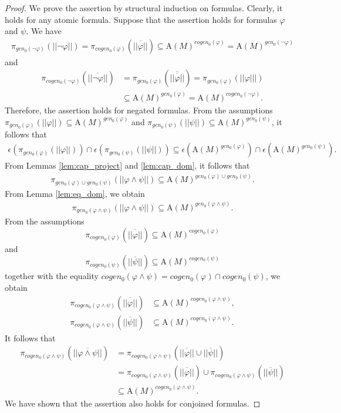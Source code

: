 \documentclass[10pt,a4paper]{amsart}
\def\A{\textrm{A}}
\def\cogen{cogen}
\def\cogenz{\cogen_0}
\def\gen{gen}
\def\genz{\gen_0}
\begin{document}
\begin{proof}
We prove the assertion by structural induction on formulas. Clearly, it holds for any atomic formula. Suppose that the assertion holds for formulas $\varphi$ and $\psi$. We have
\begin{align*}
\pi_{\genz(\neg\varphi)}(||\neg\varphi||)=\pi_{\cogenz(\varphi)}(\overline{||\varphi||})\subseteq\A(M)^{\cogenz(\varphi)}=\A(M)^{\genz(\neg\varphi)}
\end{align*}
and 
\begin{align*}
\pi_{\cogenz(\neg\varphi)}(\overline{||\neg\varphi||})&=\pi_{\genz(\varphi)}(\overline{\overline{||\varphi||}})=\pi_{\genz(\varphi)}(||\varphi|||)\\
&\subseteq\A(M)^{\genz(\varphi)}=\A(M)^{\cogenz(\neg\varphi)}.
\end{align*}
Therefore, the assertion holds for negated formulas.
From the assumptions $\pi_{\genz(\varphi)}(||\varphi||)\subseteq \A(M)^{\genz(\varphi)}$ and $\pi_{\genz(\psi)}(||\psi||)\subseteq \A(M)^{\genz(\psi)}$, it follows that 
\begin{align*}
\epsilon(\pi_{\genz(\varphi)}(||\varphi||))\cap\epsilon(\pi_{\genz(\psi)}(||\psi||))\subseteq\epsilon(\A(M)^{\genz(\varphi)})\cap\epsilon(\A(M)^{\genz(\psi)}).
\end{align*}
From Lemmas \ref{lem:cap_project} and \ref{lem:cap_dom}, it follows that
\begin{align*}
\pi_{\genz(\varphi)\cup\genz(\psi)}(||\varphi\wedge\psi||)\subseteq\A(M)^{\genz(\varphi)\cup\genz(\psi)}. 
\end{align*}
From Lemma \ref{lem:eq_dom}, we obtain
\begin{align*}
\pi_{\genz(\varphi\wedge\psi)}(||\varphi\wedge\psi||)\subseteq\A(M)^{\genz(\varphi\wedge\psi)}. 
\end{align*}
From the assumptions 
$$\pi_{\cogenz(\varphi)}(\overline{||\varphi||})\subseteq \A(M)^{\cogenz(\varphi)}$$ 
and 
$$\pi_{\cogenz(\psi)}(\overline{||\psi||})\subseteq \A(M)^{\cogenz(\psi)}$$
together with the equality $\cogenz(\varphi\wedge\psi)=\cogenz(\varphi)\cap\cogenz(\psi)$, we obtain 
\begin{align*}
\pi_{\cogenz(\varphi\wedge\psi)}(\overline{||\varphi||})&\subseteq \A(M)^{\cogenz(\varphi\wedge\psi)},\\
\pi_{\cogenz(\varphi\wedge\psi)}(\overline{||\psi||})&\subseteq \A(M)^{\cogenz(\varphi\wedge\psi)}. 
\end{align*}
It follows that
\begin{align*}
\pi_{\cogenz(\varphi\wedge\psi)}(\overline{||\varphi\wedge\psi||})&= \pi_{\cogenz(\varphi\wedge\psi)}(\overline{||\varphi||}\cup\overline{||\psi||})\\
&=\pi_{\cogenz(\varphi\wedge\psi)}(\overline{||\varphi||})\cup\pi_{\cogenz(\varphi\wedge\psi)}(\overline{||\psi||})\\
&\subseteq\A(M)^{\cogenz(\varphi\wedge\psi)}.
\end{align*}
We have shown that the assertion also holds for conjoined formulas.


\end{proof}
\end{document}
